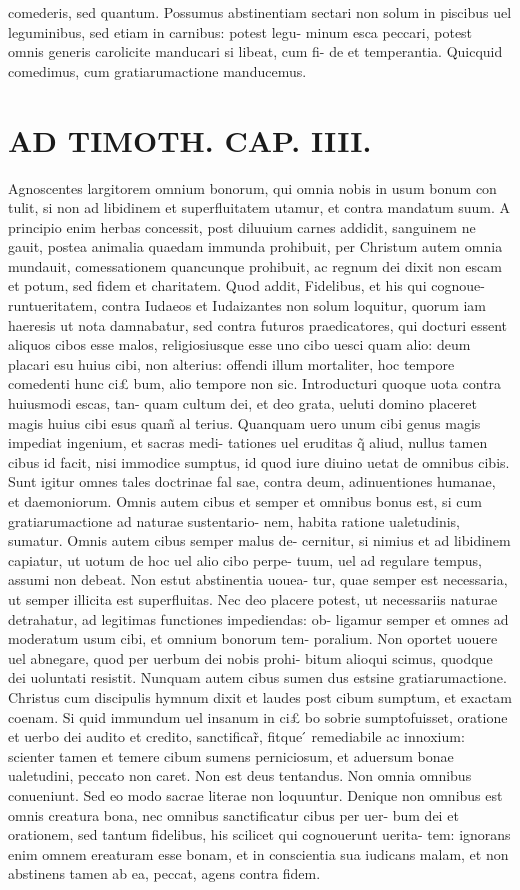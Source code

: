 \documentclass{article}
\begin{document}
\begin{pages}
comederis, sed quantum. Possumus abstinentiam sectari non solum in piscibus uel leguminibus, sed etiam in carnibus: potest legu- minum esca peccari, potest omnis generis carolicite manducari si libeat, cum fi- de et temperantia. Quicquid comedimus, cum gratiarumactione manducemus.  \pend
\section*{AD TIMOTH. CAP. IIII. }
\marginpar{[ p.507 ]}\pstart Agnoscentes largitorem omnium bonorum, qui omnia nobis in usum bonum con tulit, si non ad libidinem et superfluitatem utamur, et contra mandatum suum. A principio enim herbas concessit, post diluuium carnes addidit, sanguinem ne gauit, postea animalia quaedam immunda prohibuit, per Christum autem omnia mundauit, comessationem quancunque prohibuit, ac regnum dei dixit non escam et potum, sed fidem et charitatem. Quod addit, Fidelibus, et his qui cognoue- runtueritatem, contra Iudaeos et Iudaizantes non solum loquitur, quorum iam haeresis ut nota damnabatur, sed contra futuros praedicatores, qui docturi essent aliquos cibos esse malos, religiosiusque esse uno cibo uesci quam alio: deum placari esu huius cibi, non alterius: offendi illum mortaliter, hoc tempore comedenti hunc ci£ bum, alio tempore non sic. Introducturi quoque uota contra huiusmodi escas, tan- quam cultum dei, et deo grata, ueluti domino placeret magis huius cibi esus quam̃ al terius. Quanquam uero unum cibi genus magis impediat ingenium, et sacras medi- tationes uel eruditas q̃ aliud, nullus tamen cibus id facit, nisi immodice sumptus, id quod iure diuino uetat de omnibus cibis. Sunt igitur omnes tales doctrinae fal sae, contra deum, adinuentiones humanae, et daemoniorum. Omnis autem cibus et semper et omnibus bonus est, si cum gratiarumactione ad naturae sustentario- nem, habita ratione ualetudinis, sumatur. Omnis autem cibus semper malus de- cernitur, si nimius et ad libidinem capiatur, ut uotum de hoc uel alio cibo perpe- tuum, uel ad regulare tempus, assumi non debeat. Non estut abstinentia uouea- tur, quae semper est necessaria, ut semper illicita est superfluitas. Nec deo placere potest, ut necessariis naturae detrahatur, ad legitimas functiones impediendas: ob- ligamur semper et omnes ad moderatum usum cibi, et omnium bonorum tem- poralium. Non oportet uouere uel abnegare, quod per uerbum dei nobis prohi- bitum alioqui scimus, quodque dei uoluntati resistit. Nunquam autem cibus sumen dus estsine gratiarumactione. Christus cum discipulis hymnum dixit et laudes post cibum sumptum, et exactam coenam. Si quid immundum uel insanum in ci£ bo sobrie sumptofuisset, oratione et uerbo dei audito et credito, sanctificar̃, fitque ́ remediabile ac innoxium: scienter tamen et temere cibum sumens perniciosum, et aduersum bonae ualetudini, peccato non caret. Non est deus tentandus. Non omnia omnibus conueniunt. Sed eo modo sacrae literae non loquuntur. Denique  non omnibus est omnis creatura bona, nec omnibus sanctificatur cibus per uer- bum dei et orationem, sed tantum fidelibus, his scilicet qui cognouerunt uerita- tem: ignorans enim omnem ereaturam esse bonam, et in conscientia sua iudicans malam, et non abstinens tamen ab ea, peccat, agens contra fidem. 
\end{pages}
\end{document}
